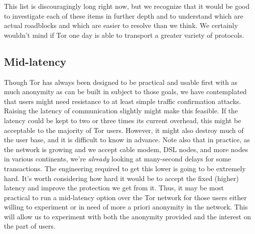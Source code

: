 \documentclass{llncs}
\begin{document}
This list is discouragingly long right now, but we recognize that it
would be good to investigate each of these items in further depth and to
understand which are actual roadblocks and which are easier to resolve
than we think. We certainly wouldn't mind if Tor one day is able to
transport a greater variety of protocols.

\subsection{Mid-latency}
\label{subsec:mid-latency}

Though Tor has always been designed to be practical and usable first
with as much anonymity as can be built in subject to those goals, we
have contemplated that users might need resistance to at least simple
traffic confirmation attacks. Raising the latency of communication
slightly might make this feasible. If the latency could be kept to two
or three times its current overhead, this might be acceptable to the
majority of Tor users. However, it might also destroy much of the user
base, and it is difficult to know in advance.  Note also that in
practice, as the network is growing and we accept cable modem, DSL
nodes, and more nodes in various continents, we're \emph{already}
looking at many-second delays for some transactions. The engineering
required to get this lower is going to be extremely hard. It's worth
considering how hard it would be to accept the fixed (higher) latency
and improve the protection we get from it. Thus, it may be most
practical to run a mid-latency option over the Tor network for those
users either willing to experiment or in need of more a priori
anonymity in the network.  This will allow us to experiment with both
the anonymity provided and the interest on the part of users.
\end{document}
